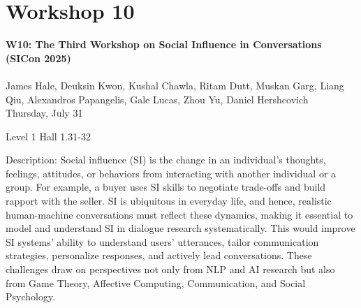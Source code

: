 \clearpage


\section[W10: The Third Workshop on Social Influence in Conversations (SICon 2025)]{Workshop 10}
\label{workshop_10}

\begin{center}
    {\Large \textbf{W10: The Third Workshop on Social Influence in Conversations (SICon 2025)}}\\
\\
    

    James Hale, Deuksin Kwon, Kushal Chawla, Ritam Dutt, Muskan Garg, Liang Qiu, Alexandros Papangelis, Gale Lucas, Zhou Yu, Daniel Hershcovich\\

   Thursday, July 31
    
    Level 1 Hall 1.31-32

\end{center}
	
Description: Social influence (SI) is the change in an individual's thoughts, feelings, attitudes, or behaviors from interacting with another individual or a group. For example, a buyer uses SI skills to negotiate trade-offs and build rapport with the seller. SI is ubiquitous in everyday life, and hence, realistic human-machine conversations must reflect these dynamics, making it essential to model and understand SI in dialogue research systematically. This would improve SI systems' ability to understand users’ utterances, tailor communication strategies, personalize responses, and actively lead conversations. These challenges draw on perspectives not only from NLP and AI research but also from Game Theory, Affective Computing, Communication, and Social Psychology.


